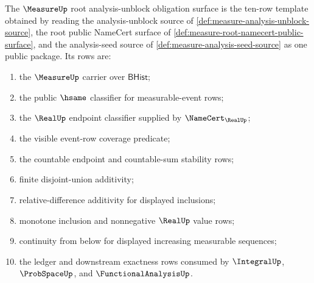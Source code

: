 \begin{definition}
\label{def:measure-root-analysis-unblock-obligation-surface}
The $\MeasureUp$ root analysis-unblock obligation surface is the ten-row
template obtained by reading the analysis-unblock source of
\autoref{def:measure-analysis-unblock-source}, the root public NameCert
surface of \autoref{def:measure-root-namecert-public-surface}, and the
analysis-seed source of \autoref{def:measure-analysis-seed-source} as one
public package. Its rows are:
\begin{enumerate}
  \item the $\MeasureUp$ carrier over $\mathsf{BHist}$;
  \item the public $\hsame$ classifier for measurable-event rows;
  \item the $\RealUp$ endpoint classifier supplied by $\NameCert_{\RealUp}$;
  \item the visible event-row coverage predicate;
  \item the countable endpoint and countable-sum stability rows;
  \item finite disjoint-union additivity;
  \item relative-difference additivity for displayed inclusions;
  \item monotone inclusion and nonnegative $\RealUp$ value rows;
  \item continuity from below for displayed increasing measurable sequences;
  \item the ledger and downstream exactness rows consumed by $\IntegralUp$,
  $\ProbSpaceUp$, and $\FunctionalAnalysisUp$.
\end{enumerate}
\end{definition}

